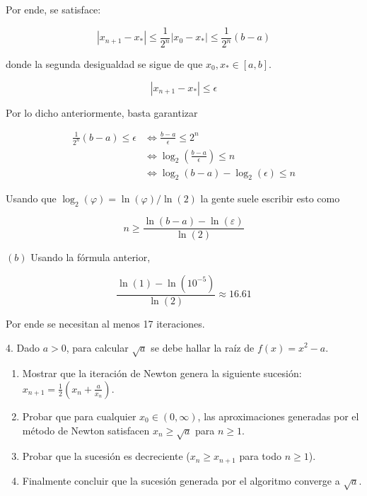 \documentclass[12pt]{article}
\begin{document}
Por ende, se satisface:

\begin{equation*}
    \left| x_{n+1} - x_* \right| \leq \frac{1}{2^n} \left| x_0 - x_* \right|
    \leq \frac{1}{2^n}( b - a )
\end{equation*}

donde la segunda desigualdad se sigue de que $x_0, x_* \in [a, b]$.

\begin{equation*}
    \left| x_{n+1} - x_* \right| \leq \epsilon
\end{equation*}

Por lo dicho anteriormente, basta garantizar 

\begin{align*}
    \frac{1}{2^n}( b - a ) \leq \epsilon 
    &\iff
    \frac{b-a}{\epsilon} \leq 2^n \\ 
    &\iff
    \log_2\left( \frac{b-a}{\epsilon} \right) \leq n \\ 
    &\iff 
    \log_2 \left( b-a \right) - \log_2(\epsilon) \leq n
\end{align*}

Usando que $\log_2(\varphi) = \ln(\varphi) / \ln(2)$ la gente suele escribir
esto como \infty

\begin{equation*}
    n \geq \frac{\ln(b - a) - \ln(\varepsilon)}{\ln(2)} 
\end{equation*}

$(b)$ Usando la fórmula anterior, 

\begin{equation*}
    \frac{\ln(1) - \ln(10^{-5})}{\ln(2)} \approx 16.61
\end{equation*}

Por ende se necesitan al menos 17 iteraciones.


 
\pagebreak
\begin{myframe}
    4. Dado $a > 0$, para calcular $\sqrt{a}$ se debe hallar la raíz de $f(x) = x^2 - a$.

\begin{enumerate}
    \item Mostrar que la iteración de Newton genera la siguiente sucesión: $x_{n+1} = \frac{1}{2}\left(x_n + \frac{a}{x_n}\right)$.
    \item Probar que para cualquier $x_0 \in (0, \infty)$, las aproximaciones generadas por el método de Newton satisfacen $x_n \geq \sqrt{a}$ para $n \geq 1$.
    \item Probar que la sucesión es decreciente ($x_n \geq x_{n+1}$ para todo $n \geq 1$).
    \item Finalmente concluir que la sucesión generada por el algoritmo converge a $\sqrt{a}$.
\end{enumerate}
\end{myframe}
~
\end{document}
